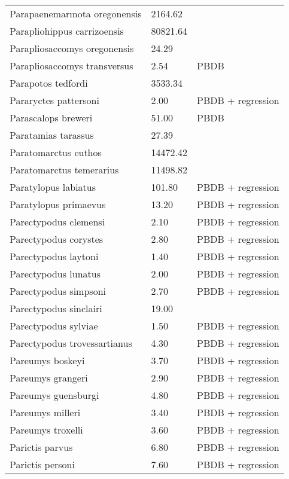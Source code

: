 \begin{longtable}{p{} p{} p{}}
    Parapaenemarmota oregonensis & 2164.62 & \cite{Tomiya2013} \\ 
    Parapliohippus carrizoensis & 80821.64 & \cite{Tomiya2013} \\ 
    Parapliosaccomys oregonensis & 24.29 & \cite{Tomiya2013} \\ 
    Parapliosaccomys transversus & 2.54 & PBDB \\ 
    Parapotos tedfordi & 3533.34 & \cite{Tomiya2013} \\ 
    Pararyctes pattersoni & 2.00 & PBDB + regression \\ 
    Parascalops breweri & 51.00 & PBDB \\ 
    Paratamias tarassus & 27.39 & \cite{Tomiya2013} \\ 
    Paratomarctus euthos & 14472.42 & \cite{Tomiya2013} \\ 
    Paratomarctus temerarius & 11498.82 & \cite{Tomiya2013} \\ 
    Paratylopus labiatus & 101.80 & PBDB + regression \\ 
    Paratylopus primaevus & 13.20 & PBDB + regression \\ 
    Parectypodus clemensi & 2.10 & PBDB + regression \\ 
    Parectypodus corystes & 2.80 & PBDB + regression \\ 
    Parectypodus laytoni & 1.40 & PBDB + regression \\ 
    Parectypodus lunatus & 2.00 & PBDB + regression \\ 
    Parectypodus simpsoni & 2.70 & PBDB + regression \\ 
    Parectypodus sinclairi & 19.00 & \cite{Wilson2012} \\ 
    Parectypodus sylviae & 1.50 & PBDB + regression \\ 
    Parectypodus trovessartianus & 4.30 & PBDB + regression \\ 
    Pareumys boskeyi & 3.70 & PBDB + regression \\ 
    Pareumys grangeri & 2.90 & PBDB + regression \\ 
    Pareumys guensburgi & 4.80 & PBDB + regression \\ 
    Pareumys milleri & 3.40 & PBDB + regression \\ 
    Pareumys troxelli & 3.60 & PBDB + regression \\ 
    Parictis parvus & 6.80 & PBDB + regression \\ 
    Parictis personi & 7.60 & PBDB + regression \\ 

\end{longtable}
